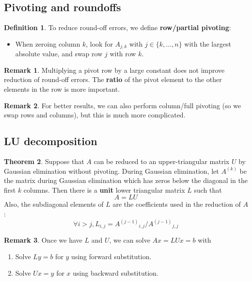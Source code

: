 \documentclass[12pt,a4paper]{article}
\theoremstyle{definition}
\newtheorem{definition}{Definition}[subsection]
\newtheorem{theorem}[definition]{Theorem}
\newtheorem*{remark}{Remark}
\begin{document}
\subsection{Pivoting and roundoffs}

\begin{definition}
	To reduce round-off errors, we define \textbf{row/partial pivoting}:
	\begin{itemize}
		\item When zeroing column $k$, look for $A_{j, k}$ with $j \in \{ k, \dots, n \}$ with the largest absolute value, and swap row $j$ with row $k$.
	\end{itemize}
\end{definition}

\begin{remark}
	Multiplying a pivot row by a large constant does not improve reduction of round-off errors. The \textbf{ratio} of the pivot element to the other elements in the row is more important. 
\end{remark}

\begin{remark}
	For better results, we can also perform column/full pivoting (so we swap rows and columns), but this is much more complicated.
\end{remark}

\subsection{LU decomposition}

\begin{theorem}
	Suppose that $A$ can be reduced to an upper-triangular matrix $U$ by Gaussian elimination without pivoting. During Gaussian elimination, let $A^{(k)}$ be the matrix during Gaussian elimination which has zeros below the diagonal in the first $k$ columns. Then there is a \textbf{unit} lower triangular matrix $L$ such that
	\[
		A = LU
	\]
	Also, the subdiagonal elements of $L$ are the coefficients used in the reduction of $A$:
	\[
		\forall i > j, L_{i, j} = {A^{(j - 1)}}_{i, j} / {A^{(j - 1)}}_{j, j}
	\]
\end{theorem}

\begin{remark}
	Once we have $L$ and $U$, we can solve $Ax = LUx = b$ with
	\begin{enumerate}
		\item Solve $Ly = b$ for $y$ using forward substitution.
		\item Solve $Ux = y$ for $x$ using backward substitution.
	\end{enumerate}
\end{remark}
\end{document}
